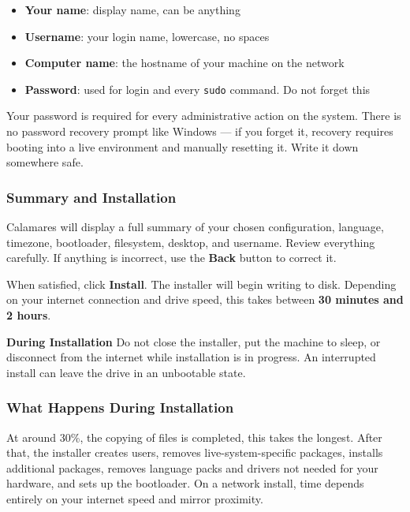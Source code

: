 \documentclass{article}
\newcommand{\code}[1]{\colorbox{codebg}{\texttt{#1}}}
\begin{document}
\begin{itemize}[leftmargin=1.5em, nosep, label={\tiny\textbullet}, nosep]
  \item \textbf{Your name}: display name, can be anything
  \item \textbf{Username}: your login name, lowercase, no spaces
  \item \textbf{Computer name}: the hostname of your machine on the network
  \item \textbf{Password}: used for login and every \code{sudo} command. Do not
    forget this
\end{itemize}

\begin{tcolorbox}[arc=12pt, outer arc=10pt,
  colback=red!5!white, colframe=red!60!black,
  title=\textbf{Warning}]
  Your password is required for every administrative action on the system. There is
  no password recovery prompt like Windows --- if you forget it, recovery requires
  booting into a live environment and manually resetting it. Write it down somewhere
  safe.
\end{tcolorbox}

\subsubsection{Summary and Installation}

Calamares will display a full summary of your chosen configuration, language,
timezone, bootloader, filesystem, desktop, and username. Review everything carefully.
If anything is incorrect, use the \textbf{Back} button to correct it.

When satisfied, click \textbf{Install}. The installer will begin writing to disk.
Depending on your internet connection and drive speed, this takes between
\textbf{30 minutes and 2 hours}.

\begin{callout}{\textbf{During Installation}}
  Do not close the installer, put the machine to sleep, or disconnect from the
  internet while installation is in progress. An interrupted install can leave the
  drive in an unbootable state.
\end{callout}

\subsubsection*{What Happens During Installation}

At around 30\%, the copying of files is completed, this takes the longest. After
that, the installer creates users, removes live-system-specific packages, installs
additional packages, removes language packs and drivers not needed for your hardware,
and sets up the bootloader. On a network install, time depends entirely on your internet speed and mirror proximity.
\end{document}
